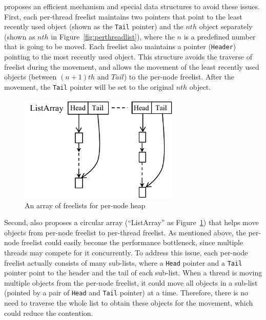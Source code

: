 \NM{} proposes an efficient mechanism and special data structures to avoid these issues. First, each per-thread freelist maintains two pointers that point to the least recently used object (shown as the \texttt{Tail} pointer) and the $nth$ object separately (shown as $nth$ in Figure~\ref{fig:perthreadlist}), where the $n$ is a predefined number that is going to be moved. Each freelist also maintains a pointer (\texttt{Header}) pointing to the most recently used object. This structure avoids the traverse of freelist during the movement, and allows the movement of the least recently used objects (between $(n+1)th$ and $Tail$) to the per-node freelist. After the movement, the \texttt{Tail} pointer will be set to the original $nth$ object. 


\begin{figure}[!ht]
\centering
\includegraphics[width=3in]{figure/listarray}
\caption{An array of freelists for per-node heap\label{fig:listarray}}
\end{figure}

Second, \NM{} also proposes a circular array (``ListArray'' as Figure~\ref{fig:listarray}) that helps move objects from per-node freelist to per-thread freelist. As mentioned above, the per-node freelist could easily become the performance bottleneck, since multiple threads may compete for it concurrently. To address this issue, each per-node freelist actually consists of many sub-lists, where a \texttt{Head} pointer and a \texttt{Tail} pointer point to the header and the tail of each sub-list. When a thread is moving multiple objects from the per-node freelist, it could move all objects in a sub-list (pointed by a pair of \texttt{Head} and \texttt{Tail} pointer) at a time. Therefore, there is no need to traverse the whole list to obtain these objects for the movement, which could reduce the contention. 

